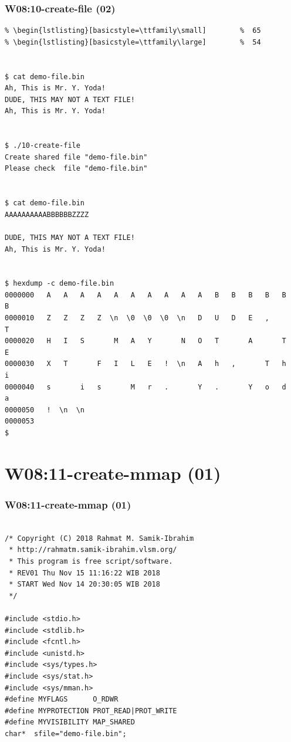 \documentclass[xcolor=table, notheorems, hyperref={pdfpagelabels=false}]{beamer}
\begin{document}
\begin{frame}[fragile]
\frametitle{W08:10-create-file (02)}
\begin{lstlisting}[basicstyle=\ttfamily\tiny]         % 108
% \begin{lstlisting}[basicstyle=\ttfamily\footnotesize] %  72
% \begin{lstlisting}[basicstyle=\ttfamily\small]        %  65
% \begin{lstlisting}[basicstyle=\ttfamily\large]        %  54


$ cat demo-file.bin 
Ah, This is Mr. Y. Yoda!
DUDE, THIS MAY NOT A TEXT FILE!
Ah, This is Mr. Y. Yoda!


$ ./10-create-file 
Create shared file "demo-file.bin"
Please check  file "demo-file.bin"


$ cat demo-file.bin 
AAAAAAAAAABBBBBBZZZZ

DUDE, THIS MAY NOT A TEXT FILE!
Ah, This is Mr. Y. Yoda!


$ hexdump -c demo-file.bin 
0000000   A   A   A   A   A   A   A   A   A   A   B   B   B   B   B   B
0000010   Z   Z   Z   Z  \n  \0  \0  \0  \n   D   U   D   E   ,       T
0000020   H   I   S       M   A   Y       N   O   T       A       T   E
0000030   X   T       F   I   L   E   !  \n   A   h   ,       T   h   i
0000040   s       i   s       M   r   .       Y   .       Y   o   d   a
0000050   !  \n  \n                                                    
0000053
$ 

\end{lstlisting}
\end{frame}

\section{W08:11-create-mmap (01)}
\begin{frame}[fragile]
\frametitle{W08:11-create-mmap (01)}
\begin{lstlisting}[basicstyle=\ttfamily\small]        %  65
% \begin{lstlisting}[basicstyle=\ttfamily\large]        %  54

/* Copyright (C) 2018 Rahmat M. Samik-Ibrahim 
 * http://rahmatm.samik-ibrahim.vlsm.org/
 * This program is free script/software.
 * REV01 Thu Nov 15 11:16:22 WIB 2018
 * START Wed Nov 14 20:30:05 WIB 2018
 */

#include <stdio.h>
#include <stdlib.h>
#include <fcntl.h>
#include <unistd.h>
#include <sys/types.h>
#include <sys/stat.h>
#include <sys/mman.h>
#define MYFLAGS      O_RDWR
#define MYPROTECTION PROT_READ|PROT_WRITE
#define MYVISIBILITY MAP_SHARED
char*  sfile="demo-file.bin";

\end{lstlisting}
\end{frame}
\end{document}
